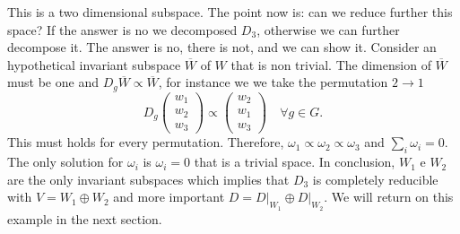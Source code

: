 \documentclass[12pt]{book}
\theoremstyle{plain}
\theoremstyle{definition}
\theoremstyle{remark}
\begin{document}
This is a two dimensional subspace. The point now is: can we reduce further this space? If the answer is no we decomposed $D_3$, otherwise we can further decompose it. The answer is no, there is not, and we can show it. Consider an hypothetical invariant subspace $\overline{W}$ of $W$ that is non trivial. The dimension of $\overline{W}$ must be one and $D_g\overline{W}\propto \overline{W}$, for instance we we take the permutation $2\to1$
\[D_g \begin{pmatrix}w_1\\w_2\\w_3\end{pmatrix} \propto \begin{pmatrix}w_2\\w_1\\w_3\end{pmatrix}\quad \forall g\in G.\]
This must holds for every permutation. Therefore, $\omega_1 \propto \omega_2\propto \omega_3$ and $\sum_i \omega_i = 0$. The only solution for $\omega_i$ is $\omega_i =0$ that is a trivial space. In conclusion, $W_1$ e $W_2$ are the only invariant subspaces which implies that $D_3$ is completely reducible with $V = W_1 \oplus W_2$ and more important $D = D\big|_{W_1} \oplus D\big|_{W_2}$. We will return on this example in the next section.
\end{document}
